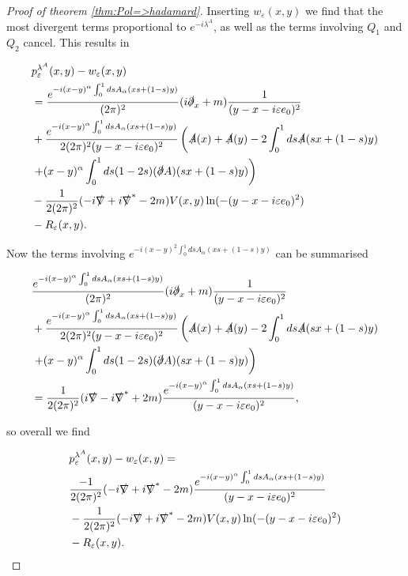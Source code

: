 \documentclass[a4paper,11pt]{article}
\begin{document}
\begin{proof}[Proof of theorem \ref{thm:Pol=>hadamard}]
Inserting \(w_\varepsilon(x,y)\) we find that the most divergent terms proportional to \(e^{-i\lambda^A}\), as well as the terms involving \(Q_1\) and \(Q_2\) cancel.
This results in 

\begin{align*}
&p_\varepsilon^{\lambda^A}(x,y)-w_\varepsilon(x,y)\\
&=\frac{e^{-i(x-y)^\alpha \int_0^1 ds A_\alpha (xs + (1-s)y)}}{(2\pi)^2}(i\slashed{\partial}_x+m)\frac{1}{(y-x-i\varepsilon e_0)^2}\\
&+\frac{e^{-i (x-y)^\alpha\int_0^1 ds A_\alpha (x s + (1-s)y)}}{2(2\pi)^2 (y-x-i\varepsilon e_0)^2}\left( \slashed{A}(x)+\slashed{A}(y) -2 \int_0^1 ds \slashed{A}(sx +(1-s)y) \right.\\
&\left.+ (x-y)^\alpha \int_0^1 ds (1-2s)(\slashed{\partial}A)(sx + (1-s)y) \right)\\
&- \frac{1}{2(2\pi)^2} (-i\slashed{\nabla}+i\slashed{\nabla}^* -2m) V(x,y)\ln (-(y-x-i\varepsilon e_0)^2)\\
&-R_\varepsilon(x,y).
\end{align*}

Now the terms involving \(e^{-i(x-y)^2\int_0^1ds A_\alpha(xs+(1-s)y)}\) can be summarised

\begin{align*}
&\frac{e^{-i(x-y)^\alpha \int_0^1 ds A_\alpha (xs + (1-s)y)}}{(2\pi)^2}(i\slashed{\partial}_x+m)\frac{1}{(y-x-i\varepsilon e_0)^2}\\
&+\frac{e^{-i (x-y)^\alpha\int_0^1 ds A_\alpha (x s + (1-s)y)}}{2(2\pi)^2 (y-x-i\varepsilon e_0)^2}\left( \slashed{A}(x)+\slashed{A}(y) -2 \int_0^1 ds \slashed{A}(sx +(1-s)y) \right.\\
&\left.+ (x-y)^\alpha \int_0^1 ds (1-2s)(\slashed{\partial}A)(sx + (1-s)y) \right)\\
&=\frac{1}{2(2\pi)^2 }(i\slashed{\nabla}-i\slashed{\nabla}^*+2m) \frac{e^{-i (x-y)^\alpha\int_0^1 ds A_\alpha (x s + (1-s)y)}}{(y-x-i\varepsilon e_0)^2},
\end{align*}

so overall we find

\begin{align*}
&p_\varepsilon^{\lambda^A}(x,y)-w_\varepsilon(x,y)=\\
&\frac{-1}{2(2\pi)^2 }(-i\slashed{\nabla}+i\slashed{\nabla}^*-2m) \frac{e^{-i (x-y)^\alpha\int_0^1 ds A_\alpha (x s + (1-s)y)}}{(y-x-i\varepsilon e_0)^2}\\
&- \frac{1}{2(2\pi)^2} (-i\slashed{\nabla}+i\slashed{\nabla}^* -2m) V(x,y)\ln (-(y-x-i\varepsilon e_0)^2)\\
&-R_\varepsilon(x,y).
\end{align*}


\end{proof}
\end{document}
